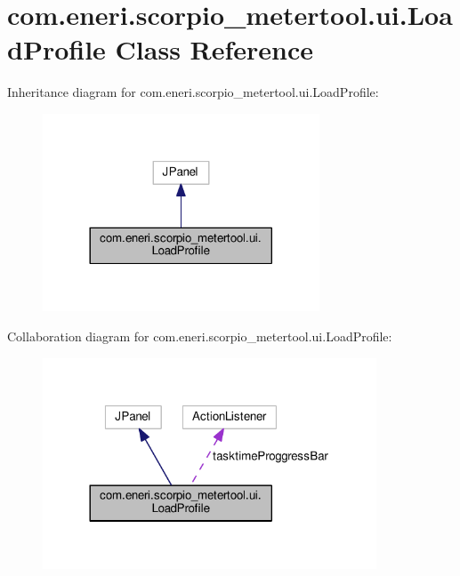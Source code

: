 \hypertarget{classcom_1_1eneri_1_1scorpio__metertool_1_1ui_1_1_load_profile}{}\section{com.\+eneri.\+scorpio\+\_\+metertool.\+ui.\+Load\+Profile Class Reference}
\label{classcom_1_1eneri_1_1scorpio__metertool_1_1ui_1_1_load_profile}


Inheritance diagram for com.\+eneri.\+scorpio\+\_\+metertool.\+ui.\+Load\+Profile\+:
\nopagebreak
\begin{figure}[H]
\begin{center}
\leavevmode
\includegraphics[width=233pt]{classcom_1_1eneri_1_1scorpio__metertool_1_1ui_1_1_load_profile__inherit__graph}
\end{center}
\end{figure}


Collaboration diagram for com.\+eneri.\+scorpio\+\_\+metertool.\+ui.\+Load\+Profile\+:
\nopagebreak
\begin{figure}[H]
\begin{center}
\leavevmode
\includegraphics[width=281pt]{classcom_1_1eneri_1_1scorpio__metertool_1_1ui_1_1_load_profile__coll__graph}
\end{center}
\end{figure}
